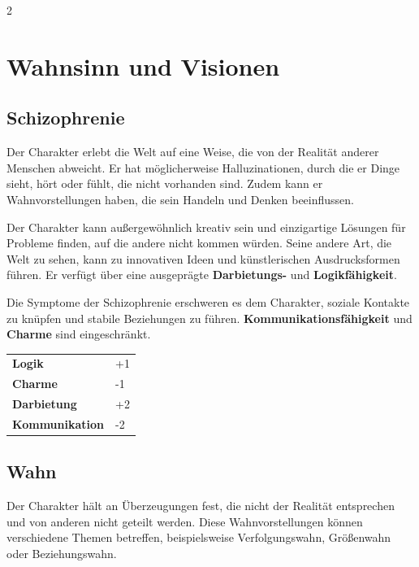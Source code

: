 \label{ch:appendix-quirks}

\begin{multicols}{2}

    \section{Wahnsinn und Visionen}

    \subsection*{Schizophrenie}

    Der Charakter erlebt die Welt auf eine Weise, die von der Realität anderer Menschen abweicht. Er hat möglicherweise Halluzinationen, durch die er Dinge sieht, hört oder fühlt, die nicht vorhanden sind. Zudem kann er Wahnvorstellungen haben, die sein Handeln und Denken beeinflussen.

    Der Charakter kann außergewöhnlich kreativ sein und einzigartige Lösungen für Probleme finden, auf die andere nicht kommen würden. Seine andere Art, die Welt zu sehen, kann zu innovativen Ideen und künstlerischen Ausdrucksformen führen. Er verfügt über eine ausgeprägte \textbf{Darbietungs-} und \textbf{Logikfähigkeit}.

    Die Symptome der Schizophrenie erschweren es dem Charakter, soziale Kontakte zu knüpfen und stabile Beziehungen zu führen. \textbf{Kommunikationsfähigkeit} und \textbf{Charme} sind eingeschränkt.

    \begin{tabular}{@{}ll@{}}
        \textbf{Logik} & +1\\
        \textbf{Charme} & -1\\
        \textbf{Darbietung} & +2\\
        \textbf{Kommunikation} & -2\\
    \end{tabular}

    \subsection*{Wahn}

    Der Charakter hält an Überzeugungen fest, die nicht der Realität entsprechen und von anderen nicht geteilt werden. Diese Wahnvorstellungen können verschiedene Themen betreffen, beispielsweise Verfolgungswahn, Größenwahn oder Beziehungswahn.


\end{multicols}
